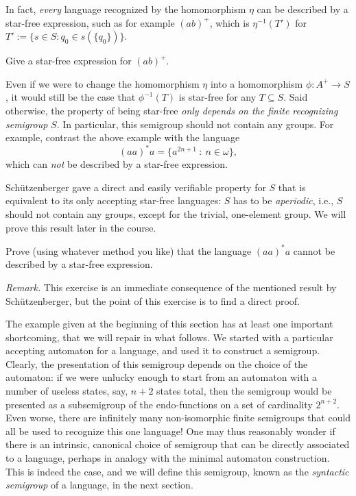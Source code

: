 In fact, \emph{every} language recognized by the homomorphism $\eta$ can be described by a star-free expression, such as for example $(ab)^+$, which is $\eta^{-1}(T')$ for $T' := \{s \in S \colon q_0 \in s(\{q_0\})\}$.
\begin{exercise}\easy
  Give a star-free expression for $(ab)^+$.
\end{exercise}
Even if we were to change the homomorphism $\eta$ into a homomorphism $\phi \colon A^+ \to S$, it would still be the case that $\phi^{-1}(T)$ is star-free for any $T \subseteq S$. Said otherwise, the property of being star-free \emph{only depends on the finite recognizing semigroup} $S$. In particular, this semigroup should not contain any groups. For example, contrast the above example with the language
\[ (aa)^*a = \{ a^{2n+1} \ \colon \ n \in \omega \},\]
which can \emph{not} be described by a star-free expression.

Schützenberger \cite{Sch65} gave a direct and easily verifiable property for $S$ that is equivalent to its only accepting star-free languages: $S$ has to be \emph{aperiodic}, i.e., $S$ should not contain any groups, except for the trivial, one-element group. We will prove this result later in the course.

\begin{exercise} \medium
  Prove (using whatever method you like) that the language $(aa)^*a$ cannot be described by a star-free expression.

  {\it Remark.} This exercise is an immediate consequence of the mentioned result by Schützenberger, but the point of this exercise is to find a direct proof.
\end{exercise}

The example given at the beginning of this section has at least one important shortcoming, that we will repair in what follows. We started with a particular accepting automaton for a language, and used it to construct a semigroup. Clearly, the presentation of this semigroup depends on the choice of the automaton: if we were unlucky enough to start from an automaton with a number of useless states, say, $n + 2$ states total, then the semigroup would be presented as a subsemigroup of the endo-functions on a set of cardinality $2^{n+2}$. Even worse, there are infinitely many non-isomorphic finite semigroups that could all be used to recognize this one language! One may thus reasonably wonder if there is an intrinsic, canonical choice of semigroup that can be directly associated to a language, perhaps in analogy with the minimal automaton construction. This is indeed the case, and we will define this semigroup, known as the \emph{syntactic semigroup} of a language, in the next section.

